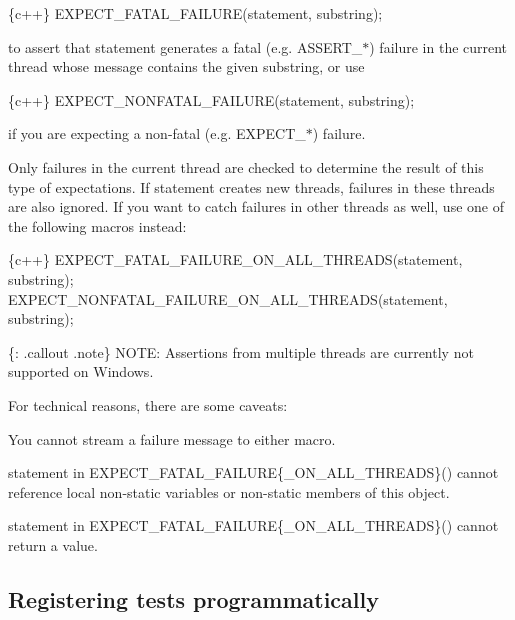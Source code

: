 \begin{DoxyCode}
\{c++\}
  EXPECT\_FATAL\_FAILURE(statement, substring);
\end{DoxyCode}


to assert that {\ttfamily statement} generates a fatal (e.\+g. {\ttfamily A\+S\+S\+E\+R\+T\+\_\+$\ast$}) failure in the current thread whose message contains the given {\ttfamily substring}, or use


\begin{DoxyCode}
\{c++\}
  EXPECT\_NONFATAL\_FAILURE(statement, substring);
\end{DoxyCode}


if you are expecting a non-\/fatal (e.\+g. {\ttfamily E\+X\+P\+E\+C\+T\+\_\+$\ast$}) failure.

Only failures in the current thread are checked to determine the result of this type of expectations. If {\ttfamily statement} creates new threads, failures in these threads are also ignored. If you want to catch failures in other threads as well, use one of the following macros instead\+:


\begin{DoxyCode}
\{c++\}
  EXPECT\_FATAL\_FAILURE\_ON\_ALL\_THREADS(statement, substring);
  EXPECT\_NONFATAL\_FAILURE\_ON\_ALL\_THREADS(statement, substring);
\end{DoxyCode}


\{\+: .callout .note\} N\+O\+TE\+: Assertions from multiple threads are currently not supported on Windows.

For technical reasons, there are some caveats\+:


\begin{DoxyEnumerate}
\item You cannot stream a failure message to either macro.
\item {\ttfamily statement} in {\ttfamily E\+X\+P\+E\+C\+T\+\_\+\+F\+A\+T\+A\+L\+\_\+\+F\+A\+I\+L\+U\+RE\{\+\_\+\+O\+N\+\_\+\+A\+L\+L\+\_\+\+T\+H\+R\+E\+A\+DS\}()} cannot reference local non-\/static variables or non-\/static members of {\ttfamily this} object.
\item {\ttfamily statement} in {\ttfamily E\+X\+P\+E\+C\+T\+\_\+\+F\+A\+T\+A\+L\+\_\+\+F\+A\+I\+L\+U\+RE\{\+\_\+\+O\+N\+\_\+\+A\+L\+L\+\_\+\+T\+H\+R\+E\+A\+DS\}()} cannot return a value.
\end{DoxyEnumerate}

\subsection*{Registering tests programmatically}


